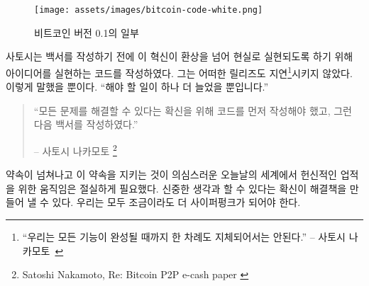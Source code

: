 \begin{figure}
  \texttt{[image: assets/images/bitcoin-code-white.png]}
 \caption{비트코인 버전 0.1의 일부}
  \label{fig:bitcoin-code-white}
\end{figure}

\begin{comment}
To make sure that his innovation transcends fantasy and becomes reality, Satoshi
wrote code to implement his idea before he wrote the whitepaper. He also made
sure not to delay\footnote{\enquote{We shouldn't delay forever until every possible
feature is done.} -- Satoshi Nakamoto~\cite{satoshi-delay}} any release forever.
After all, \enquote{there's always going to be one more thing to do.}
\end{comment}
사토시는 백서를 작성하기 전에 이 혁신이 환상을 넘어 현실로 실현되도록 하기 위해 아이디어를 실현하는 코드를 작성하였다.
그는 어떠한 릴리즈도 지연\footnote{\enquote{우리는 모든 기능이 완성될 때까지 한 차례도 지체되어서는 안된다.} -- 사토시 나카모토~\cite{satoshi-delay}}시키지 않았다.
이렇게 말했을 뿐이다. \enquote{해야 할 일이 하나 더 늘었을 뿐입니다.}


\begin{quotation}\begin{samepage}
\enquote{모든 문제를 해결할 수 있다는 확신을 위해 코드를 먼저 작성해야 했고, 그런 다음 백서를 작성하였다.}
\begin{flushright} -- 사토시 나카모토 \footnote{Satoshi Nakamoto, Re: Bitcoin P2P e-cash paper \cite{satoshi-mail-code-first}}
\end{flushright}\end{samepage}\end{quotation}

\begin{comment}
In today's world of endless promises and doubtful execution, an exercise
in dedicated building was desperately needed. Be deliberate, convince
yourself that you can actually solve the problems, and implement the
solutions. We should all aim to be a bit more cypherpunk.
\end{comment}
약속이 넘쳐나고 이 약속을 지키는 것이 의심스러운 오늘날의 세계에서 
헌신적인 업적을 위한 움직임은 절실하게 필요했다.
신중한 생각과 할 수 있다는 확신이 해결책을 만들어 낼 수 있다.
우리는 모두 조금이라도 더 사이퍼펑크가 되어야 한다.

